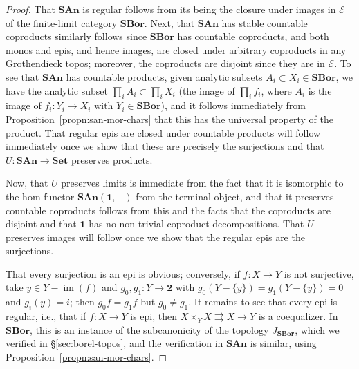 \documentclass[11pt]{amsart}
\newcommand\cE{\mathcal{E}}
\newcommand\im{\operatorname{im}}
\newcommand\SAn{\mathbf{SAn}}
\newcommand\SBor{\mathbf{SBor}}
\newcommand\Set{\mathbf{Set}}
\newcommand\set[2][]{#1\{{#2}#1\}}
\newcommand\tm{\mathbf{1}}
\newcommand\toto{\rightrightarrows}
\newcommand\two{\mathbf{2}}
\theoremstyle{definition}
\theoremstyle{remark}
\theoremstyle{plain}
\begin{document}
\begin{proof}
  That \( \SAn \) is regular follows from its being the closure under images in \( \cE \) of the finite-limit category \( \SBor \).
  Next, that \( \SAn \) has stable countable coproducts similarly follows since \( \SBor \) has countable coproducts, and both monos and epis, and hence images, are closed under arbitrary coproducts in any Grothendieck topos; moreover, the coproducts are disjoint since they are in \( \cE \).
  To see that \( \SAn \) has countable products, given analytic subsets \( A_i \subset X_i \in \SBor \), we have the analytic subset \( \prod_i A_i \subset \prod_i X_i \) (the image of \( \prod_i f_i \), where \( A_i \) is the image of \( f_i \colon Y_i \to X_i \) with \( Y_i \in \SBor \)), and it follows immediately from Proposition~\ref{propn:san-mor-chars} that this has the universal property of the product.
  That regular epis are closed under countable products will follow immediately once we show that these are precisely the surjections and that \( U \colon \SAn \to \Set \) preserves products.

  Now, that \( U \) preserves limits is immediate from the fact that it is isomorphic to the hom functor \( \SAn(\tm, -) \) from the terminal object, and that it preserves countable coproducts follows from this and the facts that the coproducts are disjoint and that \( \tm \) has no non-trivial coproduct decompositions.
  That \( U \) preserves images will follow once we show that the regular epis are the surjections.

  That every surjection is an epi is obvious; conversely, if \( f \colon X \to Y \) is not surjective, take \( y \in Y - \im(f) \) and \( g_0,g_1 \colon Y \to \two \) with \( g_0(Y - \set{y}) = g_1(Y - \set{y}) = 0 \) and \( g_i(y) = i \); then \( g_0 f = g_1 f \) but \( g_0 \ne g_1 \).
  It remains to see that every epi is regular, i.e., that if \( f \colon X \to Y \) is epi, then \( X \times_Y X \toto X \to Y \) is a coequalizer.
  In \( \SBor \), this is an instance of the subcanonicity of the topology \( J_{\SBor} \), which we verified in \S\ref{sec:borel-topos}, and the verification in \( \SAn \) is similar, using Proposition~\ref{propn:san-mor-chars}.
\end{proof}
\end{document}
